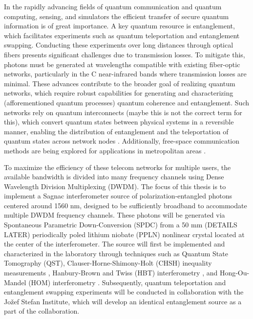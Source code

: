 \documentclass{article}
\theoremstyle{mytheoremstyle}
\theoremstyle{mytheoremstyle}
\theoremstyle{myproblemstyle}
\begin{document}
In the rapidly advancing fields of quantum communication and quantum computing, sensing, and simulators
the efficient transfer of secure quantum information is of great importance.
A key quantum resource is entanglement, which facilitates experiments such as quantum teleportation and entanglement swapping.
Conducting these experiments over long distances through optical fibers presents significant challenges due to transmission losses.
To mitigate this, photons must be generated at wavelengths compatible with existing fiber-optic networks,
particularly in the C near-infrared bands where transmission losses are minimal.
These advances contribute to the broader goal of realizing quantum networks,
which require robust capabilities for generating and characterizing (afforementioned quantum processes) quantum coherence and entanglement.
Such networks rely on quantum interconnects (maybe this is not the correct term for this), which convert quantum states between physical systems in a reversible manner,
enabling the distribution of entanglement and the teleportation of quantum states across network nodes \cite{Kimble_2008}.
Additionally, free-space communication methods are being explored for applications in metropolitan areas \cite{Kržić_et_al_2023}.
\par To maximize the efficiency of these telecom networks for multiple users,
the available bandwidth is divided into many frequency channels using Dense Wavelength Division Multiplexing (DWDM).
The focus of this thesis is to implement a Sagnac interferometer source of polarization-entangled photons centered around 1560 nm,
designed to be sufficiently broadband to accommodate multiple DWDM frequency channels.
These photons will be generated via Spontaneous Parametric Down-Conversion \cite{jesseSPDC} (SPDC) from a
50 mm (DETAILS LATER) periodically poled lithium niobate (PPLN) nonlinear crystal located at the center of the interferometer.
The source will first be implemented and characterized in the laboratory through techniques such as Quantum State Tomography (QST),
Clauser-Horne-Shimony-Holt (CHSH) inequality measurements \cite{Clauser_Horne_Shimony_Holt_1969},
Hanbury-Brown and Twiss (HBT) interferometry \cite{Brown_Twiss_1954}, and Hong-Ou-Mandel (HOM) interferometry \cite{Hong_Ou_Mandel_1987}.
Subsequently, quantum teleportation \cite{Bouwmeester_Pan_Mattle_Eibl_Weinfurter_Zeilinger_1997}
and entanglement swapping \cite{Jennewein_Weihs_Pan_Zeilinger_2001} experiments will be conducted in collaboration with the Jožef Stefan Institute,
which will develop an identical entanglement source as a part of the collaboration.
\end{document}

